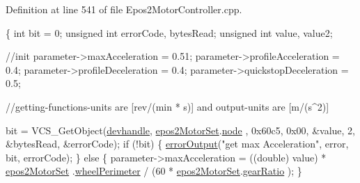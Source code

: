 Definition at line 541 of file Epos2\-Motor\-Controller.\-cpp.


\begin{DoxyCode}
\{
    \textcolor{keywordtype}{int} bit = 0;
    \textcolor{keywordtype}{unsigned} \textcolor{keywordtype}{int} errorCode, bytesRead;
    \textcolor{keywordtype}{unsigned} \textcolor{keywordtype}{int} value, value2;

    \textcolor{comment}{//init}
    parameter->maxAcceleration = 0.51;
    parameter->profileAcceleration = 0.4;
    parameter->profileDeceleration = 0.4;
    parameter->quickstopDeceleration = 0.5;

    \textcolor{comment}{//getting-functions-units are [rev/(min * s)] and output-units are
       [m/(s^2)]}

    bit = VCS\_GetObject(\hyperlink{classEpos2MotorController_a40594faab444bcba221ab9d55d1162cd}{devhandle}, \hyperlink{classEpos2MotorController_a0856f5fdd71ffa3b84a536afa085bfb1}{epos2MotorSet}.\hyperlink{structEpos2MotorController_1_1epos2Settings_ab8f18d3df17e8de9ed5250a3e53292c6}{node}
      , 0x60c5, 0x00, &value, 2, &bytesRead, &errorCode);
    \textcolor{keywordflow}{if} (!bit) \{
        \hyperlink{classEpos2MotorController_a64d5e3e3858597c111e60ba8b382a63b}{errorOutput}(\textcolor{stringliteral}{"get max Acceleration"}, error, bit, errorCode);
    \} \textcolor{keywordflow}{else} \{
        parameter->maxAcceleration = ((double) value) * \hyperlink{classEpos2MotorController_a0856f5fdd71ffa3b84a536afa085bfb1}{epos2MotorSet}
      .\hyperlink{structEpos2MotorController_1_1epos2Settings_ab7dfe30a4a13813163437d4d54fa053d}{wheelPerimeter} / (60 * \hyperlink{classEpos2MotorController_a0856f5fdd71ffa3b84a536afa085bfb1}{epos2MotorSet}.\hyperlink{structEpos2MotorController_1_1epos2Settings_adf387ce695bf432caace5e216dda3429}{gearRatio}
      );
    \}


\end{DoxyCode}

